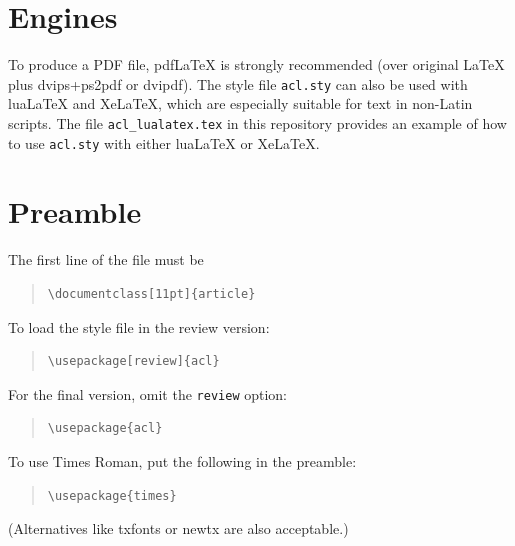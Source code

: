 \documentclass[11pt]{article}
\begin{document}

\section{Engines}

To produce a PDF file, pdf\LaTeX{} is strongly recommended (over original \LaTeX{} plus dvips+ps2pdf or dvipdf).
The style file \texttt{acl.sty} can also be used with
lua\LaTeX{} and
Xe\LaTeX{}, which are especially suitable for text in non-Latin scripts.
The file \texttt{acl\_lualatex.tex} in this repository provides
an example of how to use \texttt{acl.sty} with either
lua\LaTeX{} or
Xe\LaTeX{}.

\section{Preamble}

The first line of the file must be
\begin{quote}
\begin{verbatim}
\documentclass[11pt]{article}
\end{verbatim}
\end{quote}

To load the style file in the review version:
\begin{quote}
\begin{verbatim}
\usepackage[review]{acl}
\end{verbatim}
\end{quote}
For the final version, omit the \verb|review| option:
\begin{quote}
\begin{verbatim}
\usepackage{acl}
\end{verbatim}
\end{quote}

To use Times Roman, put the following in the preamble:
\begin{quote}
\begin{verbatim}
\usepackage{times}
\end{verbatim}
\end{quote}
(Alternatives like txfonts or newtx are also acceptable.)
\end{document}
